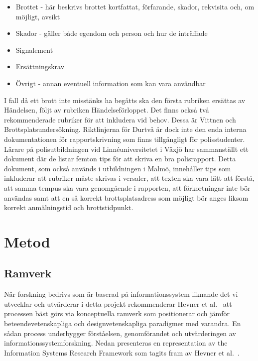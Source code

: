 \documentclass[swedish]{maucsthesis}
\begin{document}
\begin{itemize}
\item Brottet - här beskrivs brottet kortfattat, förfarande, skador, rekvisita
  och, om möjligt, avsikt
\item Skador - gäller både egendom och person och hur de inträffade
\item Signalement
\item Ersättningskrav
\item Övrigt - annan eventuell information som kan vara användbar
\end{itemize}

I fall då ett brott inte misstänks ha begåtts ska den första rubriken ersättas
av Händelsen, följt av rubriken Händelseförloppet. Det finns också två
rekommenderade rubriker för att inkludera vid behov. Dessa är Vittnen och
Brottsplatsundersökning. Riktlinjerna för Durtvå är dock inte den enda interna
dokumentationen för rapportskrivning som finns tillgängligt för polisstudenter.
Lärare på polisutbildningen vid Linnéuniversitetet i Växjö har sammanställt ett
dokument  där de listar femton tips för att skriva en bra polisrapport. Detta
dokument, som också används i utbildningen i Malmö, innehåller tips som
inkluderar att rubriker måste skrivas i versaler, att texten ska vara lätt att
förstå, att samma tempus ska vara genomgående i rapporten, att förkortningar
inte bör användas samt att en så korrekt brottsplatsadress som möjligt bör
anges liksom korrekt anmälningstid och brottstidpunkt.

\section{Metod}

\subsection{Ramverk}

När forskning bedrivs som är baserad på informationssystem liknande det vi
utvecklar och utvärderar i detta projekt rekommenderar Hevner et al.~\cite{hevner:2004} att
processen bäst görs via konceptuella ramverk som positionerar och jämför
beteendevetenskapliga och designvetenskapliga paradigmer med varandra. En sådan
process underbygger förståelsen, genomförandet och utvärderingen av
informationssystemforskning. Nedan presenteras en representation av the
Information Systems Research Framework som tagits fram av Hevner et al.~\cite{hevner:2004}.
\end{document}
